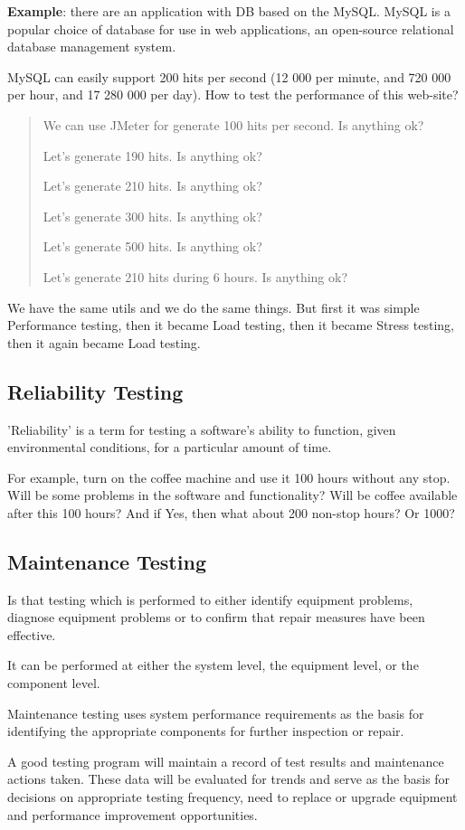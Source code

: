 \textbf{Example}: there are an application with DB based on the MySQL. MySQL is a popular choice of database for use in web applications, an open-source relational database management system.

MySQL can easily support 200 hits per second (12 000 per minute, and 720 000 per hour, and 17 280 000 per day). How to test the performance of this web-site?

\begin{quote}
We can use JMeter for generate 100 hits per second. Is anything ok?

Let's generate 190 hits. Is anything ok?

Let's generate 210 hits. Is anything ok?

Let's generate 300 hits. Is anything ok?

Let's generate 500 hits. Is anything ok?

Let's generate 210 hits during 6 hours. Is anything ok?                                                       \end{quote} 

We have the same utils and we do the same things. But first it was simple Performance testing, then it became Load testing, then it became Stress testing, then it again became Load testing.

\subsection{Reliability Testing}
\label{sec:Reliability Testing}

'Reliability' is a term for testing a software's ability to function, given environmental conditions, for a particular amount of time.

For example, turn on the coffee machine and use it 100 hours without any stop. Will be some problems in the software and functionality? Will be coffee available after this 100 hours? And if Yes, then what about 200 non-stop hours? Or 1000?

\subsection{Maintenance Testing}
\label{sec:Maintenance Testing}

Is that testing which is performed to either identify equipment problems, diagnose equipment problems or to confirm that repair measures have been effective. 

It can be performed at either the system level, the equipment level, or the component level.

Maintenance testing uses system performance requirements as the basis for identifying the appropriate components for further inspection or repair.

A good testing program will maintain a record of test results and maintenance actions taken. These data will be evaluated for trends and serve as the basis for decisions on appropriate testing frequency, need to replace or upgrade equipment and performance improvement opportunities.
